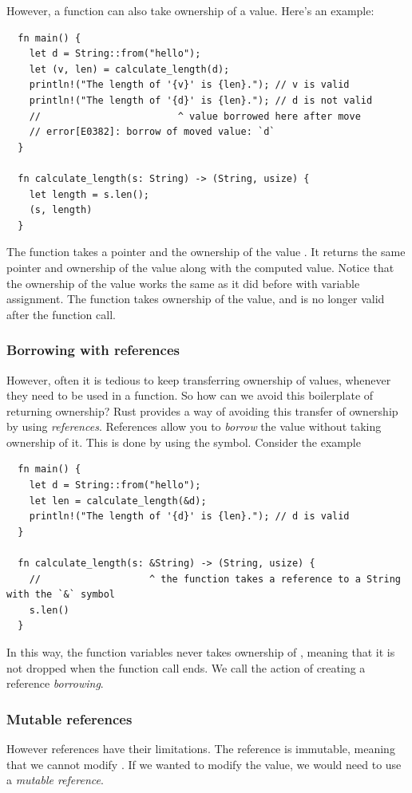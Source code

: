 \documentclass[twoside,11pt]{report}
\theoremstyle{definition}
\theoremstyle{plain}
\begin{document}
However, a function can also take ownership of a value. Here's an example:
\begin{verbatim}
  fn main() {
    let d = String::from("hello");
    let (v, len) = calculate_length(d);
    println!("The length of '{v}' is {len}."); // v is valid
    println!("The length of '{d}' is {len}."); // d is not valid
    //                        ^ value borrowed here after move
    // error[E0382]: borrow of moved value: `d`
  }

  fn calculate_length(s: String) -> (String, usize) {
    let length = s.len();
    (s, length)
  }
\end{verbatim}
The function  takes a pointer and the ownership of the  value . It returns the same pointer and ownership of the value along with the computed value. Notice that the ownership of the value works the same as it did before with variable assignment. The function  takes ownership of the value, and  is no longer valid after the function call.


\subsubsection{Borrowing with references}
However, often it is tedious to keep transferring ownership of values, whenever they need to be used in a function. So how can we avoid this boilerplate of returning ownership? Rust provides a way of avoiding this transfer of ownership by using \textit{references}. References allow you to \textit{borrow} the value without taking ownership of it. This is done by using the \rust{&} symbol. Consider the example
\begin{verbatim}
  fn main() {
    let d = String::from("hello");
    let len = calculate_length(&d);
    println!("The length of '{d}' is {len}."); // d is valid
  }

  fn calculate_length(s: &String) -> (String, usize) {
    //                   ^ the function takes a reference to a String with the `&` symbol
    s.len()
  }
\end{verbatim}

In this way, the function variables  never takes ownership of , meaning that it is not dropped when the function call ends. We call the action of creating a reference \textit{borrowing}.

\subsubsection{Mutable references}
However references have their limitations. The reference is immutable, meaning that we cannot modify . If we wanted to modify the value, we would need to use a \textit{mutable reference}.
\end{document}
